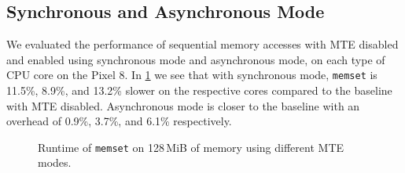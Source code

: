 \subsection{Synchronous and Asynchronous Mode}
\label{subsec:synchronous-and-asynchronous-mode}

We evaluated the performance of sequential memory accesses with MTE disabled and enabled using synchronous mode and asynchronous mode, on each type of CPU core on the Pixel 8.
In \cref{fig:sync-async-performance} we see that with synchronous mode, \texttt{memset} is 11.5\%, 8.9\%, and 13.2\% slower on the respective cores compared to the baseline with \ac{MTE} disabled.
Asynchronous mode is closer to the baseline with an overhead of 0.9\%, 3.7\%, and 6.1\% respectively.

\begin{figure}[h]
    \centering
    
    \caption{Runtime of \texttt{memset} on 128\,MiB of memory using different \ac{MTE} modes.}
    \label{fig:sync-async-performance}
\end{figure}
